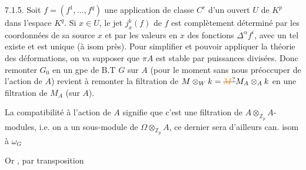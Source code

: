 7.1.5. Soit $f=(f^1,\ldots,f^q)$ une application de classe $C^r$ d'un ouvert $U$ de $K^p$ dans l'espace $K^q$. Si $x\in U$, le jet $j^k_x(f)$ de $f$ est complètement déterminé par les coordonnées de sa source $x$ et par les valeurs en $x$ des fonctions $\Delta^\alpha f^i$, avec
un tel  existe et est unique (à isom  près).  Pour simplifier et pouvoir appliquer la théorie des déformations, on va supposer que $\pi A$ est stable par puissances divisées. Donc remonter $G_0$ en un gpe de B.T $G$ sur $A$ (pour le moment sans nous préoccuper de l'action de $A$) revient à remonter la filtration de $M\otimes_W k=\deleted{\unsure{M}}M_A\otimes_A k$ en une filtration de $M_A$ (sur $A$).


La compatibilité à l'action de $A$ signifie que c'est une filtration de $A\otimes_{\mathbb Z_p}A$-modules, i.e. on a un sous-module  de $\Omega\otimes_{\mathbb Z_p}A$,  ce dernier sera  d'ailleurs can. isom à $\omega_G$

Or
, par transposition


